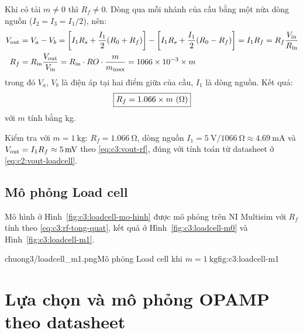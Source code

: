 Khi có tải $m \neq 0$ thì $R_f \neq 0$. Dòng qua mỗi nhánh của cầu bằng một nửa dòng nguồn
($I_2 = I_3 = I_1/2$), nên:
\begin{align}
    V_{\mathrm{out}} &= V_a - V_b
           = \left[ I_1 R_s + \frac{I_1}{2}(R_0 + R_f) \right] - \left[ I_1 R_s + \frac{I_1}{2}(R_0 - R_f) \right]
           = I_1 R_f = R_f \frac{V_{\mathrm{in}}}{R_{\mathrm{in}}} \label{eq:c3:vout-rf} \\
    R_f   &= R_{\mathrm{in}} \frac{V_{\mathrm{out}}}{V_{\mathrm{in}}}
           = R_{\mathrm{in}} \cdot RO \cdot \frac{m}{m_{\max}}
           = 1066 \times 10^{-3} \times m \label{eq:c3:rf-tong-quat}
\end{align}
trong đó $V_a$, $V_b$ là điện áp tại hai điểm giữa của cầu, $I_1$ là dòng nguồn. Kết quả:
\[
    \ketqua{R_f = 1.066 \times m \ (\unit{\ohm})}
\]
với $m$ tính bằng \unit{\kilo\gram}.

Kiểm tra với $m = \qty{1}{\kilo\gram}$: $R_f = \qty{1.066}{\ohm}$, dòng nguồn
$I_1 = \qty{5}{\volt} / \qty{1066}{\ohm} \approx \qty{4.69}{\milli\ampere}$ và
$V_{\mathrm{out}} = I_1 R_f \approx \qty{5}{\milli\volt}$ theo \eqref{eq:c3:vout-rf}, đúng với tính toán từ datasheet
ở \eqref{eq:c2:vout-loadcell}.

\subsection{Mô phỏng Load cell}
\label{sec:c3:mo-phong-loadcell}

Mô hình ở Hình~\ref{fig:c3:loadcell-mo-hinh} được mô phỏng trên NI Multisim với $R_f$ tính theo
\eqref{eq:c3:rf-tong-quat}, kết quả ở Hình~\ref{fig:c3:loadcell-m0} và Hình~\ref{fig:c3:loadcell-m1}.

%
        {chuong3/loadcell_m1.png}{Mô phỏng Load cell khi $m = \qty{1}{\kilo\gram}$}{fig:c3:loadcell-m1}


\section{Lựa chọn và mô phỏng OPAMP theo datasheet}
\label{sec:c3:opamp}


